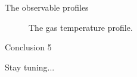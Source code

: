 \documentclass[aspectratio=43]{beamer}
\begin{document}
\begin{frame}{The observable profiles}
{\begin{figure}
    \caption{The gas temperature profile.}
  \end{figure}}
\end{frame}

\begin{frame}{Conclusion 5}
    \begin{center}
        {\Large Stay tuning...}
    \end{center}
\end{frame}
\end{document}
